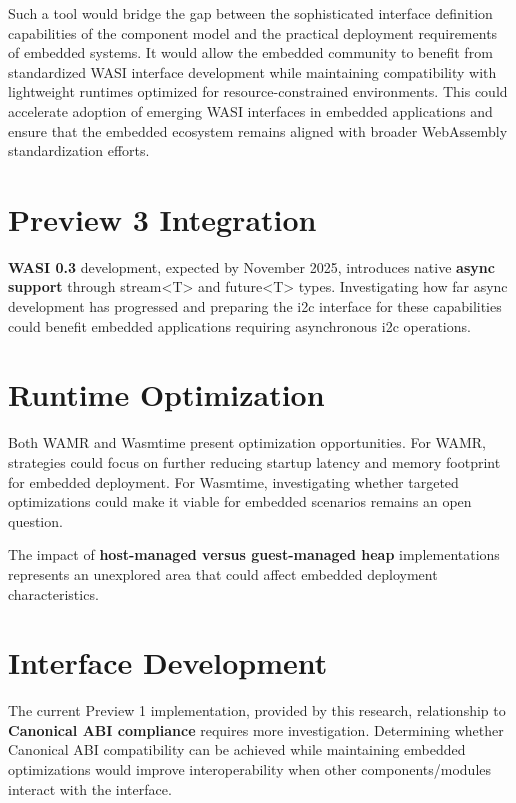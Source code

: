 Such a tool would bridge the gap between the sophisticated interface definition capabilities of the component model and the practical deployment requirements of embedded systems. It would allow the embedded community to benefit from standardized WASI interface development while maintaining compatibility with lightweight runtimes optimized for resource-constrained environments. This could accelerate adoption of emerging WASI interfaces in embedded applications and ensure that the embedded ecosystem remains aligned with broader WebAssembly standardization efforts.

\section*{Preview 3 Integration}
\label{sec:preview3-integration}

\textbf{WASI 0.3} development, expected by November 2025, introduces native \textbf{async support} through stream<T> and future<T> types. Investigating how far async development has progressed and preparing the \acrshort{i2c} interface for these capabilities could benefit embedded applications requiring asynchronous \acrshort{i2c} operations.

\section*{Runtime Optimization}
\label{sec:runtime-optimization}

Both WAMR and Wasmtime present optimization opportunities. For WAMR, strategies could focus on further reducing startup latency and memory footprint for embedded deployment. For Wasmtime, investigating whether targeted optimizations could make it viable for embedded scenarios remains an open question.

The impact of \textbf{host-managed versus guest-managed heap} implementations represents an unexplored area that could affect embedded deployment characteristics.

\section*{Interface Development}
\label{sec:interface-development}

The current Preview 1 implementation, provided by this research, relationship to \textbf{Canonical ABI compliance} requires more investigation. Determining whether Canonical ABI compatibility can be achieved while maintaining embedded optimizations would improve interoperability when other components/modules interact with the interface.

